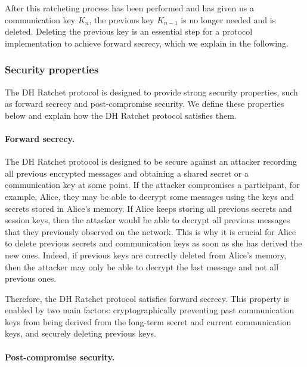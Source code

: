 After this ratcheting process has been performed and has given us a communication key $K_n$, the previous key $K_{n-1}$ is no longer needed and is deleted.
Deleting the previous key is an essential step for a protocol implementation to achieve forward secrecy, which we explain in the following.

\subsubsection{Security properties}
\label{sec:security-properties}

The DH Ratchet protocol is designed to provide strong security properties, such as forward secrecy and post-compromise security.
We define these properties below and explain how the DH Ratchet protocol satisfies them.

\paragraph{Forward secrecy.}
\label{sec:forward-secrecy}

The DH Ratchet protocol is designed to be secure against an attacker recording all previous encrypted messages and obtaining a shared secret or a communication key at some point.
If the attacker compromises a participant, for example, Alice, they may be able to decrypt some messages using the keys and secrets stored in Alice's memory. If Alice keeps storing all previous secrets and session keys, then the attacker would be able to decrypt all previous messages that they previously observed on the network. This is why it is crucial for Alice to delete previous secrets and communication keys as soon as she has derived the new ones.
Indeed, if previous keys are correctly deleted from Alice's memory, then the attacker may only be able to decrypt the last message and not all previous ones.

Therefore, the DH Ratchet protocol satisfies forward secrecy. This property is enabled by two main factors: cryptographically preventing past communication keys from being derived from the long-term secret and current communication keys, and securely deleting previous keys.

\paragraph{Post-compromise security.}
\label{sec:post-compromise-security}

